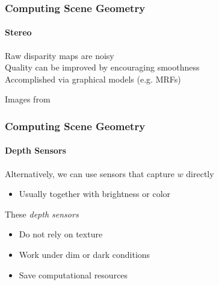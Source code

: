 \documentclass[xetex,professionalfont]{beamer}
\newcommand{\eg}{\mbox{e.g.}\xspace} %
\begin{document}

\begin{frame}
\frametitle{Computing Scene Geometry}
\framesubtitle{Stereo}

Raw disparity maps are noisy\\\medskip
Quality can be improved by encouraging smoothness\\\medskip
Accomplished via graphical models (\eg MRFs) %

\bigskip
\begin{center}
    {\centering Images from \cite{prince12}}
\end{center}

\end{frame}


\begin{frame}
\frametitle{Computing Scene Geometry}
\framesubtitle{Depth Sensors}

Alternatively, we can use sensors that capture $w$ directly
\begin{itemize}
    \item Usually together with brightness or color
\end{itemize}

\bigskip
These \emph{depth sensors}
\begin{itemize}
    \item Do not rely on texture
    \item Work under dim or dark conditions
    \item Save computational resources %
\end{itemize}

\end{frame}

\end{document}
